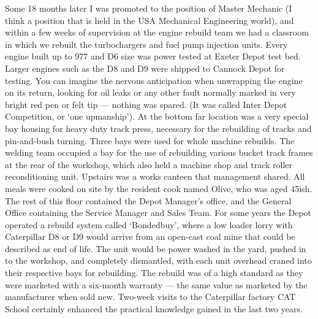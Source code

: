 
Some 18 months later I was promoted to the position of Master Mechanic (I think
a position that is held in the USA Mechanical Engineering world), and within a
few weeks of supervision at the engine rebuild team we had a classroom in which
we rebuilt the turbochargers and fuel pump injection units. Every engine built
up to 977 and D6 size was power tested at Exeter Depot test bed. Larger engines
such as the D8 and D9 were shipped to Cannock Depot for testing. You can
imagine the nervous anticipation when unwrapping the engine on its return,
looking for oil leaks or any other fault normally marked in very bright red pen
or felt tip --- nothing was spared. (It was called Inter Depot Competition, or
`one upmanship'). At the bottom far location was a very special bay housing for
heavy duty track press, necessary for the rebuilding of tracks and pin-and-bush
turning. Three bays were used for whole machine rebuilds. The welding team
occupied a bay for the use of rebuilding various bucket track frames at the
rear of the workshop, which also held a machine shop and track roller
reconditioning unit. Upstairs was a works canteen that management shared. All
meals were cooked on site by the resident cook named Olive, who was aged 45ish.
The rest of this floor contained the Depot Manager's office, and the General
Office containing the Service Manager and Sales Team. For some years the Depot
operated a rebuild system called `Bondedbuy', where a low loader lorry with
Caterpillar D8 or D9 would arrive from an open-cast coal mine that could be
described as end of life. The unit would be power washed in the yard, pushed in
to the workshop, and completely dismantled, with each unit overhead craned into
their respective bays for rebuilding. The rebuild was of a high standard as
they were marketed with a six-month warranty --- the same value as marketed by
the manufacturer when sold new. Two-week visits to the Caterpillar factory
CAT School certainly enhanced the practical knowledge gained in the last two
years.


